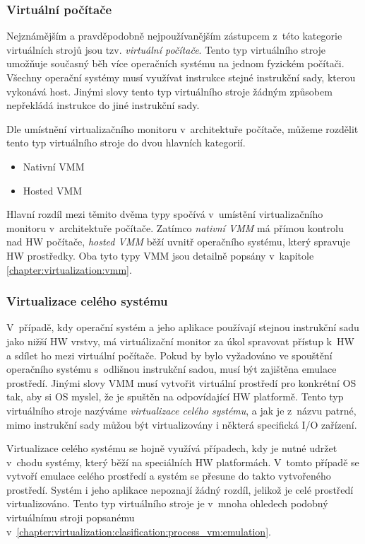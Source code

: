 \subsubsection{Virtuální počítače}
\label{chapter:virtualization:clasification:system_vm:virtual_computer}
Nejznámějším a pravděpodobně nejpoužívanějším zástupcem z~této kategorie virtuálních strojů jsou tzv. \textit{virtuální počítače}.
Tento typ virtuálního stroje umožňuje současný běh více operačních systému na jednom fyzickém počítači. Všechny operační systémy
musí využívat instrukce stejné instrukční sady, kterou vykonává host. Jinými slovy tento typ virtuálního stroje žádným způsobem
nepřekládá instrukce do jiné instrukční sady.

Dle umístnění virtualizačního monitoru v~architektuře počítače, můžeme rozdělit tento typ virtuálního stroje do dvou hlavních kategorií.  
\begin{itemize}
  \item Nativní VMM
  \item Hosted VMM
\end{itemize}
Hlavní rozdíl mezi těmito dvěma typy spočívá v~umístění virtualizačního monitoru v~architektuře počítače. Zatímco 
\textit{nativní VMM} má přímou kontrolu nad HW počítače, \textit{hosted VMM} běží uvnitř operačního systému, který spravuje
HW prostředky. Oba tyto typy VMM jsou detailně popsány v~kapitole \ref{chapter:virtualization:vmm}.   
\subsubsection{Virtualizace celého systému}
\label{chapter:virtualization:clasification:system_vm:whole_system_virtualization}
V~případě, kdy operační systém a jeho aplikace používají stejnou instrukční sadu jako nižší HW vrstvy, má virtuálizační monitor
za úkol spravovat přístup k~HW a sdílet ho mezi virtuální počítače. Pokud by bylo vyžadováno ve spouštění operačního systému
s~odlišnou instrukční sadou, musí být zajištěna emulace prostředí. Jinými slovy VMM musí vytvořit virtuální prostředí pro
konkrétní OS tak, aby si OS myslel, že je spuštěn na odpovídající HW platformě. Tento typ virtuálního stroje nazýváme \textit{virtualizace celého systému},
a jak je z~názvu patrné, mimo instrukční sady můžou být virtualizovány i některá specifická I/O zařízení.

Virtualizace celého systému se hojně využívá případech, kdy je nutné udržet v~chodu systémy, který běží na speciálních HW platformách.
V~tomto případě se vytvoří emulace celého prostředí a systém se přesune do takto vytvořeného prostředí. Systém i jeho aplikace
nepoznají žádný rozdíl, jelikož je celé prostředí virtualizováno. Tento typ virtuálního stroje je v~mnoha ohledech podobný
virtuálnímu stroji popsanému v~\ref{chapter:virtualization:clasification:process_vm:emulation}.
